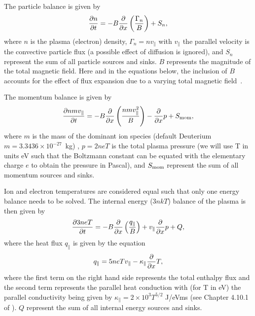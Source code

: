 \documentclass[amsmath,amssymb,a4]{revtex4-2}
\begin{document}
\noindent The particle balance is given by
\begin{equation}\label{particle_balance}
    {\partial n \over \partial t} = - B{\partial \over \partial x} \left({\Gamma_n \over B}\right) + S_n,
\end{equation}
where $n$ is the plasma (electron) density, $\Gamma_n = n v_\parallel$ with $v_\parallel$ the parallel velocity is the convective particle flux (a possible effect of diffusion is ignored), and $S_n$ represent the sum of all particle sources and sinks. $B$ represents the magnitude of the total magnetic field. Here and in the equations below, the inclusion of $B$ accounts for the effect of flux expansion due to a varying total magnetic field~\cite{dudson2019,havlickova2013}.

\noindent The momentum balance is given by
\begin{equation}\label{momentum_balance}
    {\partial n m v_\parallel \over \partial t} = - B{\partial \over \partial x} \left({n m v_\parallel^2 \over B}\right) - {\partial \over \partial x} p + S_{\rm mom},
\end{equation}
where $m$ is the mass of the dominant ion species (default Deuterium $m = 3.3436 \times 10^{-27}$~kg) , $p = 2 n e T$ is the total plasma pressure (we will use T in units eV such that the Boltzmann constant can be equated with the elementary charge $e$ to obtain the pressure in Pascal), and $S_{\rm mom}$ represent the sum of all momentum sources and sinks.

\noindent Ion and electron temperatures are considered equal such that only one energy balance needs to be solved. The internal energy ($3 n k T$) balance of the plasma is then given by
\begin{equation}\label{energy_balance}
    {\partial 3 n e T \over \partial t} = - B{\partial \over \partial x} \left({q_\parallel \over B}\right) + v_\parallel {\partial \over \partial x} p + Q,
\end{equation}
where the heat flux $q_\parallel$ is given by the equation
\begin{equation}\label{heat_flux}
    q_\parallel = 5 n e T v_\parallel - \kappa_\parallel {\partial \over \partial x} T,
\end{equation}
where the first term on the right hand side represents the total enthalpy flux and the second term represents the parallel heat conduction with (for T in eV) the parallel conductivity being given by $\kappa_\parallel = 2 \times 10^3 T^{5/2}$ J/eVms (see Chapter 4.10.1 of \cite{stangeby}). $Q$ represent the sum of all internal energy sources and sinks.
\end{document}
